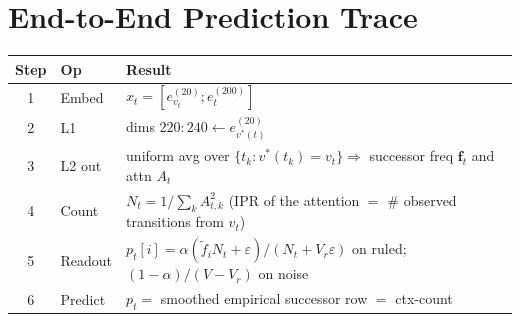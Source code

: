 \documentclass[11pt]{article}
\newcommand{\ev}[2]{e^{(#1)}_{#2}}
\newcommand{\fvec}{\mathbf{f}}
\newcommand{\vstar}{v^{*}}
\begin{document}
\section{End-to-End Prediction Trace}
\begin{center}\small
\begin{tabular}{@{}clp{10.6cm}@{}}
\toprule
Step & Op & Result\\
\midrule
1 & Embed   & $x_t=[\ev{20}{v_t};\ev{200}{t}]$\\
2 & L1      & dims $220{:}240\leftarrow\ev{20}{\vstar(t)}$\\
3 & L2 out  & uniform avg over $\{t_k:\vstar(t_k)=v_t\}\Rightarrow$ successor freq $\fvec_t$ and attn $A_t$\\
4 & Count   & $N_t=1/\sum_k A_{t,k}^2$ (IPR of the attention $=$ \# observed transitions from $v_t$)\\
5 & Readout & $p_t[i]=\alpha(\tilde f_i N_t+\varepsilon)/(N_t+V_r\varepsilon)$ on ruled; $(1-\alpha)/(V-V_r)$ on noise\\
6 & Predict & $p_t=$ smoothed empirical successor row $=$ ctx-count\\
\bottomrule
\end{tabular}
\end{center}

\end{document}
